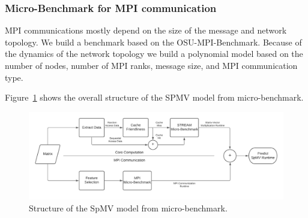 \documentclass[conference, 10ppt]{IEEEtran}
\begin{document}
\subsubsection{Micro-Benchmark for MPI communication}
MPI communications mostly depend on the size of the message and network topology. We build a benchmark based on the OSU-MPI-Benchmark.
Because of the dynamics of the network topology we build a polynomial model based on the number of nodes, number of MPI ranks, message size, 
and MPI communication type.  

Figure~\ref{fig:spmv-model-from-benchmark} shows the overall structure of the SPMV model from micro-benchmark.

\begin{figure}[hbt!]
	\centering
	\includegraphics[width=0.96\linewidth]{figures/spmv_hardware_model.pdf}
	\caption{Structure of the SpMV model from micro-benchmark.}
	\label{fig:spmv-model-from-benchmark}
\end{figure}
\end{document}
